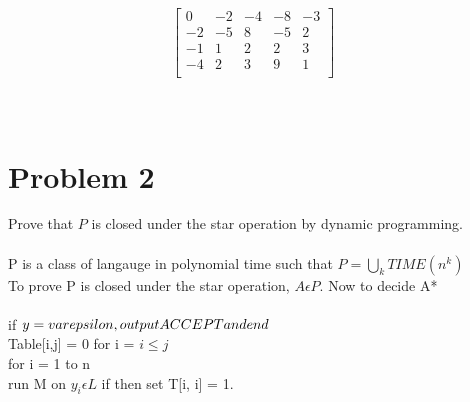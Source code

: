 \documentclass[12pt]{article}
\begin{document}
$$
\begin{bmatrix} 
0  & -2 & -4 & -8 & -3 \\
-2 & -5 & 8  & -5 & 2  \\
-1 & 1  & 2  &  2 & 3  \\
-4 & 2  & 3  &  9 & 1  \\
\end{bmatrix}
\quad
$$
\\\\

\newpage
\section*{Problem 2}
Prove that $P$ is closed under the star operation by dynamic programming.
\\\\
P is a class of langauge in polynomial time such that $P=\bigcup_k TIME(n^k)$\\To prove P is closed under the star operation, $A\epsilon P$. Now to decide A*\\
\\
if $y = \\varepsilon, output ACCEPT and end$\\
Table[i,j] = 0 for i = $i \leq j$\\
for i = 1 to n \\\hspace{40 pt} run M on $y_i \epsilon L$ if  then set T[i, i] = 1.\\
\end{document}

